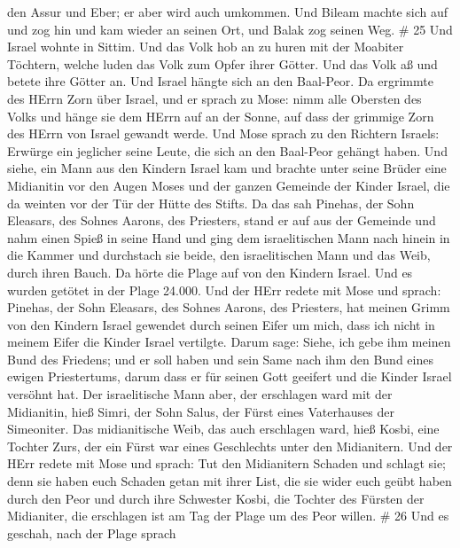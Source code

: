 den Assur und Eber; er aber wird auch umkommen.  Und Bileam
machte sich auf und zog hin und kam wieder an seinen Ort, und Balak zog
seinen Weg. \# 25  Und Israel wohnte in Sittim. Und das Volk
hob an zu huren mit der Moabiter Töchtern,  welche luden das
Volk zum Opfer ihrer Götter. Und das Volk aß und betete ihre Götter an.
 Und Israel hängte sich an den Baal-Peor. Da ergrimmte des
HErrn Zorn über Israel,  und er sprach zu Mose: nimm alle
Obersten des Volks und hänge sie dem HErrn auf an der Sonne, auf dass
der grimmige Zorn des HErrn von Israel gewandt werde.  Und
Mose sprach zu den Richtern Israels: Erwürge ein jeglicher seine Leute,
die sich an den Baal-Peor gehängt haben.  Und siehe, ein
Mann aus den Kindern Israel kam und brachte unter seine Brüder eine
Midianitin vor den Augen Moses und der ganzen Gemeinde der Kinder
Israel, die da weinten vor der Tür der Hütte des Stifts.  Da
das sah Pinehas, der Sohn Eleasars, des Sohnes Aarons, des Priesters,
stand er auf aus der Gemeinde und nahm einen Spieß in seine Hand
 und ging dem israelitischen Mann nach hinein in die Kammer
und durchstach sie beide, den israelitischen Mann und das Weib, durch
ihren Bauch. Da hörte die Plage auf von den Kindern Israel. 
Und es wurden getötet in der Plage 24.000.  Und der HErr
redete mit Mose und sprach:  Pinehas, der Sohn Eleasars,
des Sohnes Aarons, des Priesters, hat meinen Grimm von den Kindern
Israel gewendet durch seinen Eifer um mich, dass ich nicht in meinem
Eifer die Kinder Israel vertilgte.  Darum sage: Siehe, ich
gebe ihm meinen Bund des Friedens;  und er soll haben und
sein Same nach ihm den Bund eines ewigen Priestertums, darum dass er für
seinen Gott geeifert und die Kinder Israel versöhnt hat. 
Der israelitische Mann aber, der erschlagen ward mit der Midianitin,
hieß Simri, der Sohn Salus, der Fürst eines Vaterhauses der Simeoniter.
 Das midianitische Weib, das auch erschlagen ward, hieß
Kosbi, eine Tochter Zurs, der ein Fürst war eines Geschlechts unter den
Midianitern.  Und der HErr redete mit Mose und sprach:
 Tut den Midianitern Schaden und schlagt sie; 
denn sie haben euch Schaden getan mit ihrer List, die sie wider euch
geübt haben durch den Peor und durch ihre Schwester Kosbi, die Tochter
des Fürsten der Midianiter, die erschlagen ist am Tag der Plage um des
Peor willen. \# 26  Und es geschah, nach der Plage sprach
